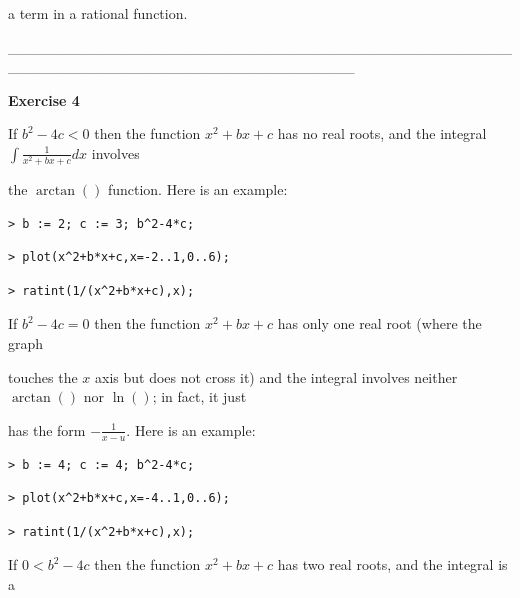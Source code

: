 \documentclass{article}
\begin{document}
\begin{Maple Normal}
a term in a rational function.
\end{Maple Normal}
\begin{Maple Normal}
\_\_\_\_\_\_\_\_\_\_\_\_\_\_\_\_\_\_\_\_\_\_\_\_\_\_\_\_\_\_\_\_\_\_\_\_\_\_\_\_\_\_\_\_\_\_\_\_\_\_\_\_\_\_\_\_\_\_\_\_\_\_\_\_\_\_\_\_\_\_\_\_\_\_\_\_\_\_\_\_\_
\end{Maple Normal}
\begin{Maple Heading 2}
\textbf{Exercise 4}
\end{Maple Heading 2}
\begin{Maple Normal}
If 
$b^{2}-4 c <0$ then the function 
$x^{2}+b x +c$ has no real roots, and the integral 
$\int \frac{1}{x^{2}+b x +c}d x$ involves
\end{Maple Normal}
\begin{Maple Normal}
the 
$\arctan ()$ function.   Here is an example:
\end{Maple Normal}
\begin{lstlisting}
> b := 2; c := 3; b^2-4*c;
\end{lstlisting}
\begin{lstlisting}
> plot(x^2+b*x+c,x=-2..1,0..6);

\end{lstlisting}
\begin{lstlisting}
> ratint(1/(x^2+b*x+c),x);
\end{lstlisting}
\begin{Maple Normal}
If 
$b^{2}-4 c =0$ then the function 
$x^{2}+b x +c$ has only one real root (where the graph 
\end{Maple Normal}
\begin{Maple Normal}
touches the 
$x$ axis but does not cross it) and the integral involves neither 
$\arctan ()$ nor 
$\ln ()$; in fact, it just
\end{Maple Normal}
\begin{Maple Normal}
has the form 
$-\frac{1}{x -u}$.  Here is an example:
\end{Maple Normal}
\begin{lstlisting}
> b := 4; c := 4; b^2-4*c;
\end{lstlisting}
\begin{lstlisting}
> plot(x^2+b*x+c,x=-4..1,0..6);

\end{lstlisting}
\begin{lstlisting}
> ratint(1/(x^2+b*x+c),x);
\end{lstlisting}
\begin{Maple Normal}
If 
$0<b^{2}-4 c$ then the function 
$x^{2}+b x +c$ has two real roots,  and the integral is a
\end{Maple Normal}
\end{document}
